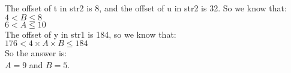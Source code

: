 \documentclass{article}
\begin{document}
The offset of t in str2 is 8,
and the offset of u in str2 is 32. So
we know that:
$4 < B \le 8$ \\
$6 < A \le 10$ \\
The offset of y in str1 is 184, so we know that: \\
$176 < 4 \times A \times B \le 184$ \\
So the answer is: \\
$A = 9$ and $B = 5$.
\end{document}
